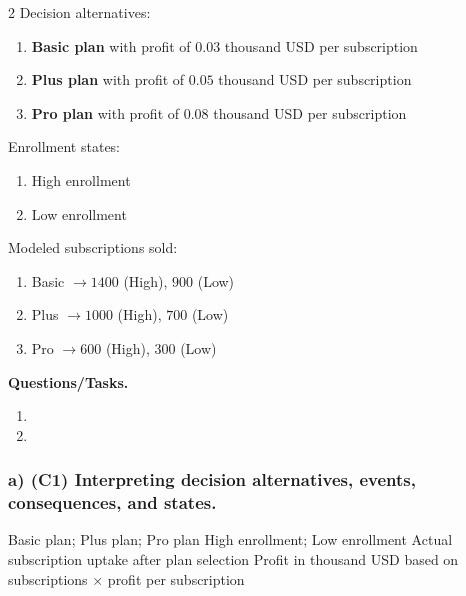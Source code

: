 	\begin{multicols}{2}
		Decision alternatives:
		\begin{enumerate}[label=\arabic*.]
			\item \textbf{Basic plan} with profit of $0.03$ thousand USD per subscription
			\item \textbf{Plus plan} with profit of $0.05$ thousand USD per subscription
			\item \textbf{Pro plan} with profit of $0.08$ thousand USD per subscription
		\end{enumerate}
	
		Enrollment states:
		\begin{enumerate}[label=\arabic*.]
			\item High enrollment
			\item Low enrollment
		\end{enumerate}
	
			\columnbreak
	
		Modeled subscriptions sold:
		\begin{enumerate}[label=\arabic*.]
			\item Basic $\to 1400$ (High), $900$ (Low)
			\item Plus $\to 1000$ (High), $700$ (Low)
			\item Pro $\to 600$ (High), $300$ (Low)
		\end{enumerate}
	\end{multicols}

	\textbf{Questions/Tasks.}
	\begin{enumerate}[label=\textbf{\alph*)}]
		\item {}
		\item {}
	\end{enumerate}
	
	\subsubsection*{a) \textbf{(C1)} Interpreting decision alternatives, events, consequences, and states.}
	\label{subsec:problem5-rural-internet-subscriptions-c1}
	\DecisionElementsTable
	{Basic plan; Plus plan; Pro plan}
	{High enrollment; Low enrollment}
	{Actual subscription uptake after plan selection}
	{Profit in thousand USD based on subscriptions $\times$ profit per subscription}
	
